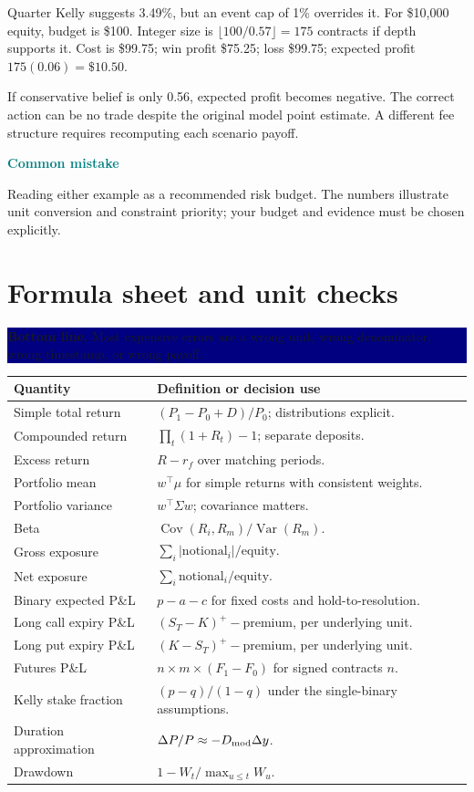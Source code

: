 \documentclass[10pt,letterpaper]{article}
\newcommand{\bl}[1]{\noindent\colorbox{navy}{\parbox{\dimexpr\linewidth-2\fboxsep}{\color{white}\textbf{Bottom line.} #1}}\par\medskip}
\newcommand{\topic}[2]{\clearpage\section{#1}\bl{#2}}
\newcommand{\sub}[1]{\par\textbf{\textcolor{teal}{#1}}\par}
\newcommand{\pit}[1]{\sub{Common mistake}#1}
\begin{document}
Quarter Kelly suggests 3.49\%, but an event cap of 1\% overrides it. For \$10,000 equity, budget is \$100. Integer size is $\lfloor100/0.57\rfloor=175$ contracts if depth supports it. Cost is \$99.75; win profit \$75.25; loss \$99.75; expected profit $175(0.06)=\$10.50$.

If conservative belief is only 0.56, expected profit becomes negative. The correct action can be no trade despite the original model point estimate. A different fee structure requires recomputing each scenario payoff.
\pit{Reading either example as a recommended risk budget. The numbers illustrate unit conversion and constraint priority; your budget and evidence must be chosen explicitly.}
\topic{Formula sheet and unit checks}{Most expensive errors are a wrong unit, wrong denominator, wrong timestamp, or wrong payoff.}
\begin{tabularx}{\linewidth}{@{}lX@{}}\toprule
Quantity & Definition or decision use\\\midrule
Simple total return & $(P_1-P_0+D)/P_0$; distributions explicit.\\
Compounded return & $\prod_t(1+R_t)-1$; separate deposits.\\
Excess return & $R-r_f$ over matching periods.\\
Portfolio mean & $w^\top\mu$ for simple returns with consistent weights.\\
Portfolio variance & $w^\top\Sigma w$; covariance matters.\\
Beta & $\operatorname{Cov}(R_i,R_m)/\operatorname{Var}(R_m)$.\\
Gross exposure & $\sum_i|\text{notional}_i|/\text{equity}$.\\
Net exposure & $\sum_i\text{notional}_i/\text{equity}$.\\
Binary expected P\&L & $p-a-c$ for fixed costs and hold-to-resolution.\\
Long call expiry P\&L & $(S_T-K)^+-\text{premium}$, per underlying unit.\\
Long put expiry P\&L & $(K-S_T)^+-\text{premium}$, per underlying unit.\\
Futures P\&L & $n\times m\times(F_1-F_0)$ for signed contracts $n$.\\
Kelly stake fraction & $(p-q)/(1-q)$ under the single-binary assumptions.\\
Duration approximation & $\Delta P/P\approx-D_{\rm mod}\Delta y$.\\
Drawdown & $1-W_t/\max_{u\le t}W_u$.\\\bottomrule
\end{tabularx}
\end{document}
